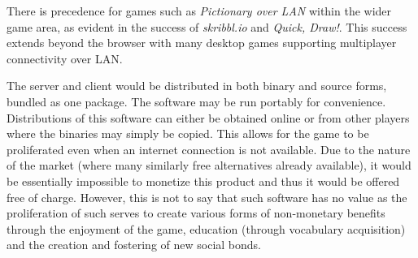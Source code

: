 \documentclass[12pt,letterpaper]{article}
\begin{document}
There is precedence for games such as \textit{Pictionary over LAN} within the wider game area, as evident in the success of \textit{skribbl.io} and \textit{Quick, Draw!}. This success extends beyond the browser with many desktop games supporting multiplayer connectivity over LAN.

The server and client would be distributed in both binary and source forms, bundled as one package. The software may be run portably for convenience. Distributions of this software can either be obtained online or from other players where the binaries may simply be copied. This allows for the game to be proliferated even when an internet connection is not available.  Due to the nature of the market (where many similarly free alternatives already available), it would be essentially impossible to monetize this product and thus it would be offered free of charge. However, this is not to say that such software has no value as the proliferation of such serves to create various forms of non-monetary benefits through the enjoyment of the game, education (through vocabulary acquisition) and the creation and fostering of new social bonds.
\end{document}
